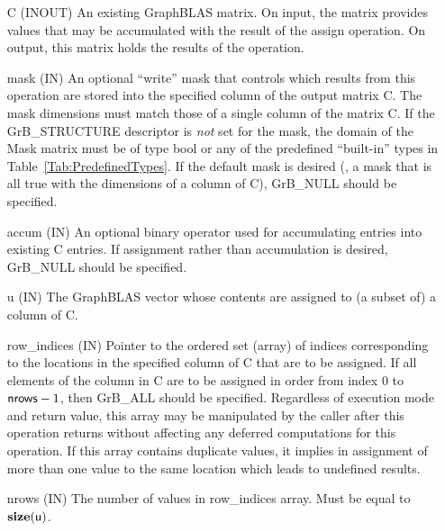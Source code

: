 \begin{itemize}[leftmargin=1.1in]
    \item[{\sf C}]    ({\sf INOUT}) An existing GraphBLAS matrix.  On input,
    the matrix provides values that may be accumulated with the result of the
    assign operation.  On output, this matrix holds the results of the
    operation.

    \item[{\sf mask}] ({\sf IN}) An optional ``write'' mask that controls which
    results from this operation are stored into the specified column of the output matrix {\sf C}. The 
    mask dimensions must match those of a single column of the matrix {\sf C}. If the 
    {\sf GrB\_STRUCTURE} descriptor is {\em not} set for the mask, the domain of the
    {\sf Mask} matrix must be of type {\sf bool} or any of the predefined 
    ``built-in'' types in Table~\ref{Tab:PredefinedTypes}.  If the default
    mask is desired (\ie, a mask that is all {\sf true} with the dimensions of a column of {\sf C}), 
    {\sf GrB\_NULL} should be specified.

    \item[{\sf accum}] ({\sf IN}) An optional binary operator used for accumulating
    entries into existing {\sf C} entries. If assignment rather than accumulation is
    desired, {\sf GrB\_NULL} should be specified.

    \item[{\sf u}]    ({\sf IN}) The GraphBLAS vector whose contents are 
    assigned to (a subset of) a column of {\sf C}.

    \item[{\sf row\_indices}]  ({\sf IN}) Pointer to the ordered set (array) of 
    indices corresponding to the locations in the specified column of {\sf C} 
    that are to be assigned.  If all elements of the column in {\sf C} are to be 
    assigned in order from index $0$ to ${\sf nrows} - 1$, then {\sf GrB\_ALL} should be 
    specified.  Regardless of execution mode and return value, this array may be
    manipulated by the caller after this operation returns without affecting any 
    deferred computations for this operation.
    If this array contains duplicate values, it implies in assignment of more 
    than one value to the same location which leads to undefined results.
    
    \item[{\sf nrows}] ({\sf IN}) The number of values in {\sf row\_indices} array.
    Must be equal to $\bold{size}({\sf u})$.
    

\end{itemize}
